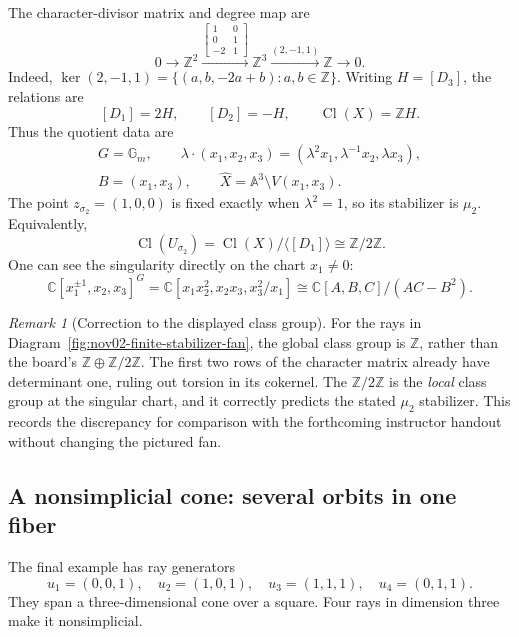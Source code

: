 \documentclass[11pt]{article}
\theoremstyle{definition}
\theoremstyle{remark}
\newtheorem{Rmk}{Remark}
\DeclareMathOperator{\Cl}{Cl}
\newcommand{\A}{\mathbb A}
\newcommand{\C}{\mathbb C}
\newcommand{\Z}{\mathbb Z}
\newcommand{\Gm}{\mathbb G_m}
\begin{document}
The character-divisor matrix and degree map are
\[
0\longrightarrow\Z^2
\xrightarrow{\left[\begin{smallmatrix}1&0\\0&1\\-2&1\end{smallmatrix}\right]}
\Z^3\xrightarrow{(2,-1,1)}\Z\longrightarrow0.
\]
Indeed, \(\ker(2,-1,1)=\{(a,b,-2a+b):a,b\in\Z\}\).
Writing \(H=[D_3]\), the relations are
\[
[D_1]=2H,\qquad[D_2]=-H,\qquad\Cl(X)=\Z H.
\]
Thus the quotient data are
\[
\begin{gathered}
G=\Gm,\qquad
\lambda\cdot(x_1,x_2,x_3)
=(\lambda^2x_1,\lambda^{-1}x_2,\lambda x_3),\\
B=(x_1,x_3),\qquad
\widehat X=\A^3\setminus V(x_1,x_3).
\end{gathered}
\]
The point \(z_{\sigma_2}=(1,0,0)\) is fixed exactly when
\(\lambda^2=1\), so its stabilizer is \(\mu_2\).
Equivalently,
\[
\Cl(U_{\sigma_2})=\Cl(X)/\langle[D_1]\rangle
\cong\Z/2\Z.
\]
One can see the singularity directly on the chart \(x_1\ne0\):
\[
\C[x_1^{\pm1},x_2,x_3]^G
=\C[x_1x_2^2,x_2x_3,x_3^2/x_1]
\cong\C[A,B,C]/(AC-B^2).
\]

\begin{Rmk}[Correction to the displayed class group]
For the rays in Diagram~\ref{fig:nov02-finite-stabilizer-fan}, the
global class group is \(\Z\), rather than the board's
\(\Z\oplus\Z/2\Z\). The first two rows of the character matrix
already have determinant one, ruling out torsion in its cokernel.
The \(\Z/2\Z\) is the \emph{local} class group at the singular
chart, and it correctly predicts the stated \(\mu_2\) stabilizer.
This records the discrepancy for comparison with the forthcoming
instructor handout without changing the pictured fan.
\end{Rmk}

\Needspace{9cm}
\subsection{A nonsimplicial cone: several orbits in one fiber}

The final example has ray generators
\[
u_1=(0,0,1),\quad u_2=(1,0,1),\quad
u_3=(1,1,1),\quad u_4=(0,1,1).
\]
They span a three-dimensional cone over a square. Four rays in
dimension three make it nonsimplicial.
\end{document}

